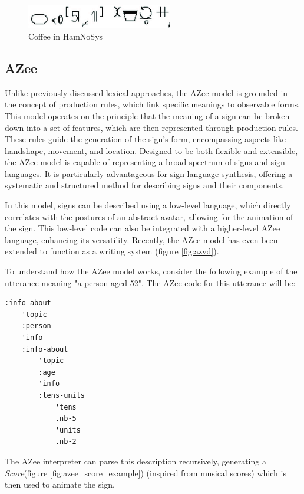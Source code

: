 \documentclass[../../main.tex]{subfiles}
\begin{document}
\begin{figure}
  \centering \includegraphics[width = 2.5in]{chapters/background_work/images/hamnosys_coffee.png}
  \caption{Coffee in HamNoSys}
  \label{fig:hamnosys_coffee}
\end{figure}

\subsection{AZee}
\label{subsec:azee}

Unlike previously discussed lexical approaches, the AZee model is grounded in the concept of production rules, which link specific meanings to observable forms. This model operates on the principle that the meaning of a sign can be broken down into a set of features, which are then represented through production rules. These rules guide the generation of the sign's form, encompassing aspects like handshape, movement, and location. Designed to be both flexible and extensible, the AZee model is capable of representing a broad spectrum of signs and sign languages. It is particularly advantageous for sign language synthesis, offering a systematic and structured method for describing signs and their components.

In this model, signs can be described using a low-level language, which directly correlates with the postures of an abstract avatar, allowing for the animation of the sign. This low-level code can also be integrated with a higher-level AZee language, enhancing its versatility. Recently, the AZee model has even been extended to function as a writing system \cite{filhol2024software} (figure \ref{fig:azvd}).

To understand how the AZee model works, consider the following example of the utterance meaning "a person aged 52". The AZee code for this utterance will be:

\begin{verbatim}
:info-about
	'topic
	:person
	'info
	:info-about
		'topic
		:age
		'info
		:tens-units
			'tens
			.nb-5
			'units
			.nb-2
\end{verbatim}

The AZee interpreter can parse this description recursively, generating a \emph{Score}(figure \ref{fig:azee_score_example}) (inspired from musical scores) which is then used to animate the sign.
\end{document}
